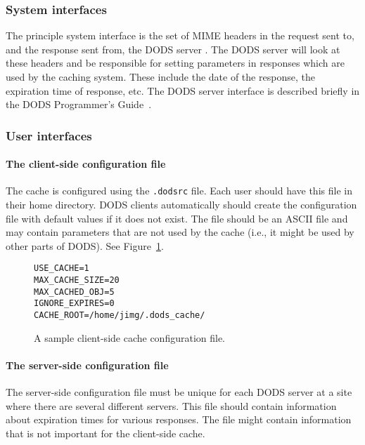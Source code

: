 \documentclass{article}
\begin{document}
\subsubsection{System interfaces}
The principle system interface is the set of MIME headers in the request sent
to, and the response sent from, the DODS server . The DODS server will look
at these headers and be responsible for setting parameters in responses which
are used by the caching system. These include the date of the response, the
expiration time of response, etc. The DODS server interface is described
briefly in the DODS Programmer's Guide~\cite{DODS:prog-guide}.

\subsubsection{User interfaces}
\label{sec:ui}
\paragraph{The client-side configuration file}
The cache is configured using the \texttt{.dodsrc} file. Each user should
have this file in their home directory. DODS clients automatically should
create the configuration file with default values if it does not exist. The
file should be an ASCII file and may contain parameters that are not used by
the cache (i.e., it might be used by other parts of DODS). See
Figure~\ref{fig:config-file}.

\begin{figure}
\begin{center}
\begin{verbatim}
USE_CACHE=1
MAX_CACHE_SIZE=20
MAX_CACHED_OBJ=5
IGNORE_EXPIRES=0
CACHE_ROOT=/home/jimg/.dods_cache/
\end{verbatim}
\end{center}
\caption{A sample client-side cache configuration file.}
\label{fig:config-file}
\end{figure}

\paragraph{The server-side configuration file}
\label{sec:server-config}
The server-side configuration file must be unique for each DODS server at a
site where there are several different servers. This file should contain
information about expiration times for various responses. The file might
contain information that is not important for the client-side cache.
\end{document}
